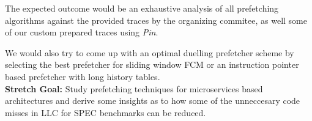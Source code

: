 
The expected outcome would be an exhaustive analysis of all prefetching algorithms against the provided
traces by the organizing commitee, as well some of our custom prepared traces using \textit{Pin}.

We would also try to come up with an optimal duelling prefetcher scheme by selecting the best prefetcher for
sliding window FCM or an instruction pointer based prefetcher with long history tables. \\

\textbf{Stretch Goal:} Study prefetching techniques for microservices based architectures 
\cite{asmdb} and derive some insights as to how some of the unneccesary code misses in LLC for SPEC 
benchmarks can be reduced.
